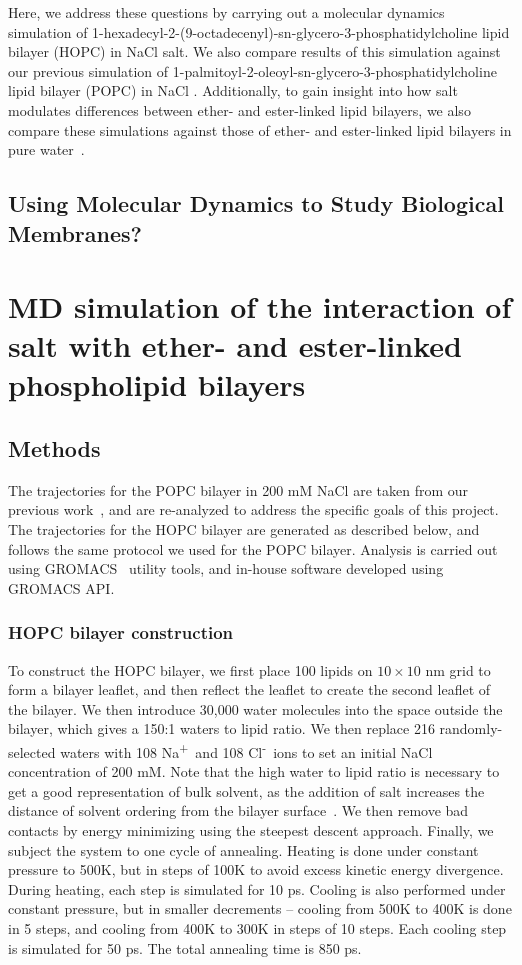 \documentclass[12pt,preprint,times,openany,draft]{book}
\newcommand{\na}{Na\textsuperscript{+}~}
\newcommand{\cl}{Cl\textsuperscript{-}~}
\begin{document}
Here, we address these questions by carrying out a molecular dynamics simulation of 
1-hexadecyl-2-(9-octadecenyl)-sn-glycero-3-phosphatidylcholine lipid bilayer (HOPC) in NaCl salt. 
We also compare results of this simulation against our previous simulation of 
1-palmitoyl-2-oleoyl-sn-glycero-3-phosphatidylcholine lipid bilayer (POPC) 
in NaCl \cite{kruczek:2017}. Additionally, to gain insight into how salt modulates differences between ether- 
and ester-linked lipid bilayers, we also compare these simulations against those of ether- and ester-linked lipid bilayers in pure water~\cite{kruczek:2017:ether}. 
\section{Using Molecular Dynamics to Study Biological Membranes?}
\chapter{MD simulation of the interaction of salt with ether- and ester-linked phospholipid bilayers}
\section{Methods}
The trajectories for the POPC bilayer in 200 mM NaCl are taken from our previous work~\cite{kruczek:2017}, 
and are re-analyzed to address the specific goals of this project. The trajectories
for the HOPC bilayer are generated as described below, and follows the same protocol we used for the POPC bilayer. 
Analysis is carried out using GROMACS~\cite{abraham:2015,pall:2014,van:2005,lindahl:2001,berendsen:1995} utility 
tools, and in-house software developed using GROMACS API.

\subsection{HOPC bilayer construction}
To construct the HOPC bilayer, we first place 100 lipids on $10 \times 10$ nm grid to form a bilayer leaflet, and then reflect the leaflet to 
create the second leaflet of the bilayer. We then introduce 30,000 water molecules into the space outside the bilayer, which gives a
 150:1 waters to lipid ratio. We then replace 216 randomly-selected waters with 108 \na and 108 \cl ions to set an initial 
NaCl concentration of 200 mM. Note that the high water to lipid ratio is necessary to get a good representation of bulk solvent, 
as the addition of salt increases the distance of solvent ordering from the bilayer surface~\cite{kruczek:2017}. We then 
remove bad contacts by energy minimizing using the steepest descent approach. Finally, we subject the system to one cycle of annealing. Heating 
is done under constant pressure to 500K, but in steps of 100K to avoid excess kinetic energy divergence. During heating, each step is simulated 
for 10 ps. Cooling is also performed under constant pressure, but in smaller decrements -- cooling from 500K to 
400K is done in 5 steps, and cooling from 400K to 300K in steps of 10 steps. Each cooling step is simulated for 50 ps. The total annealing time is 850 ps.
\end{document}
